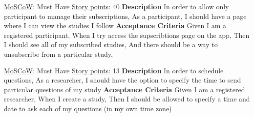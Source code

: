\documentclass[12pt, a4paper]{report}
\begin{document}
\vspace*{20px}

\begin{tcolorbox}[width=\textwidth,colback={White},title={\textbf {Subscription Management}},colbacktitle=grey,coltitle=black]
\underline{MoSCoW}: Must Have 
\hfill
\underline {Story points}: 40
\newline
\newline
\blindtext \textbf{Description}
\newline
In order to allow only participant to manage their subscriptions,\newline
As a participant,\newline
I should have a page where I can view the studies I follow \newline
\newline
 \textbf{Acceptance Criteria}
 \newline
Given I am a registered participant, \newline
When I try access the supscribtions page on the app, \newline
Then I should see all of my subscribed studies, \newline
And there should be a way to unsubscribe from a particular study, 
\end{tcolorbox}  

\vspace*{20px}

\begin{tcolorbox}[width=\textwidth,colback={White},title={\textbf {Scheduling Questions}},colbacktitle=grey,coltitle=black]
\underline{MoSCoW}: Must Have 
\hfill
\underline {Story points}: 13
\newline
\newline
\blindtext \textbf{Description}
\newline
In order to schedule questions, \newline
As a researcher, \newline
I should have the option to specify the time to send particular questions of my study \newline
\newline
 \textbf{Acceptance Criteria}
 \newline
Given I am a registered researcher, \newline
When I create a study, \newline
Then I should be allowed to specify a time and date to ask each of my questions (in my own time zone) \newline
\end{tcolorbox}  
\end{document}
